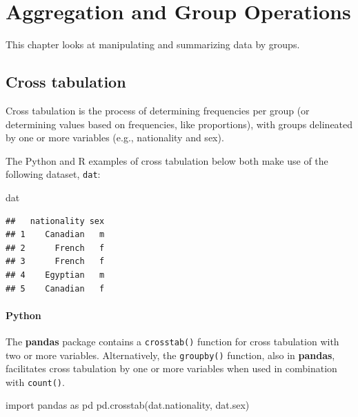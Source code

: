 \documentclass[
]{book}
\newenvironment{Shaded}{\begin{snugshade}}{\end{snugshade}}
\newcommand{\ImportTok}[1]{#1}
\newcommand{\NormalTok}[1]{#1}
\begin{document}
\hypertarget{aggregation-and-group-operations}{%
\chapter{Aggregation and Group Operations}\label{aggregation-and-group-operations}}

This chapter looks at manipulating and summarizing data by groups.

\hypertarget{cross-tabulation}{%
\section{Cross tabulation}\label{cross-tabulation}}

Cross tabulation is the process of determining frequencies per group (or determining values based on frequencies, like proportions), with groups delineated by one or more variables (e.g., nationality and sex).

The Python and R examples of cross tabulation below both make use of the following dataset, \texttt{dat}:

\begin{Shaded}
\begin{Highlighting}[]
\NormalTok{dat}
\end{Highlighting}
\end{Shaded}

\begin{verbatim}
##   nationality sex
## 1    Canadian   m
## 2      French   f
## 3      French   f
## 4    Egyptian   m
## 5    Canadian   f
\end{verbatim}

\hypertarget{python-38}{%
\subsubsection*{Python}\label{python-38}}

The \textbf{pandas} package contains a \texttt{crosstab()} function for cross tabulation with two or more variables. Alternatively, the \texttt{groupby()} function, also in \textbf{pandas}, facilitates cross tabulation by one or more variables when used in combination with \texttt{count()}.

\begin{Shaded}
\begin{Highlighting}[]
\ImportTok{import}\NormalTok{ pandas }\ImportTok{as}\NormalTok{ pd}
\NormalTok{pd.crosstab(dat.nationality, dat.sex)}
\end{Highlighting}
\end{Shaded}
\end{document}
